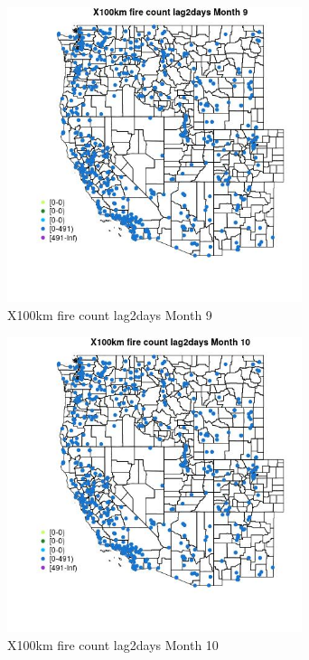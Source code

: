 \begin{figure} 
\centering  
\includegraphics[width=0.77\textwidth]{Code_Outputs/Report_ML_input_PM25_Step4_part_e_de_duplicated_aves_compiled_2019-05-14wNAs_MapObsMo9X100km_fire_count_lag2days.jpg} 
\caption{\label{fig:Report_ML_input_PM25_Step4_part_e_de_duplicated_aves_compiled_2019-05-14wNAsMapObsMo9X100km_fire_count_lag2days}X100km fire count lag2days Month 9} 
\end{figure} 
 

\begin{figure} 
\centering  
\includegraphics[width=0.77\textwidth]{Code_Outputs/Report_ML_input_PM25_Step4_part_e_de_duplicated_aves_compiled_2019-05-14wNAs_MapObsMo10X100km_fire_count_lag2days.jpg} 
\caption{\label{fig:Report_ML_input_PM25_Step4_part_e_de_duplicated_aves_compiled_2019-05-14wNAsMapObsMo10X100km_fire_count_lag2days}X100km fire count lag2days Month 10} 
\end{figure} 
 

